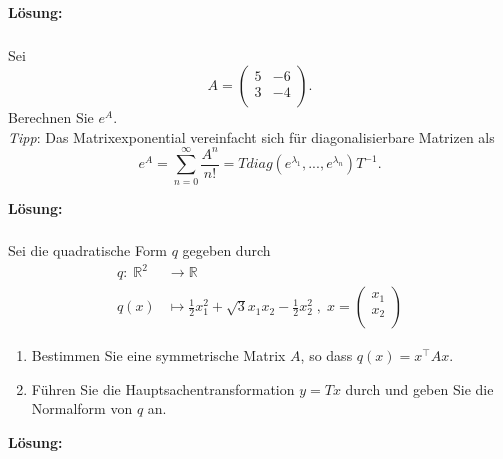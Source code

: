 \noindent \textbf{Lösung:}

\newpage
\subsubsection{} %
Sei \[
A = \begin{pmatrix}
5 & -6 \\
3 & -4 \\
\end{pmatrix}.
\]
Berechnen Sie $e^A$.\\

\noindent \textit{Tipp}: Das Matrixexponential vereinfacht sich für diagonalisierbare Matrizen als 
\[e^A = \sum_{n=0}^{\infty} \frac{A^n}{n!} = Tdiag(e^{\lambda_1}, ..., e^{\lambda_n})T^{-1}.\]

\noindent \textbf{Lösung:}

\newpage
\subsubsection{} %
Sei die quadratische Form $q$ gegeben durch 
\[\begin{aligned}
q: \; \mathbb{R}^2 &\rightarrow \mathbb{R} \\
q(x) &\mapsto \frac{1}{2}x_1^2 + \sqrt{3}x_1x_2-\frac{1}{2}x_2^2 \;, \;x= \begin{pmatrix}
x_1 \\
x_2\\
\end{pmatrix}
\end{aligned}\]
\begin{enumerate}[label=\alph*)]
    \item Bestimmen Sie eine symmetrische Matrix $A$, so dass $q(x)=x^\top Ax$.
    \item Führen Sie die Hauptsachentransformation $y=Tx$ durch und geben Sie die Normalform von $q$ an.
\end{enumerate}
\noindent \textbf{Lösung:}